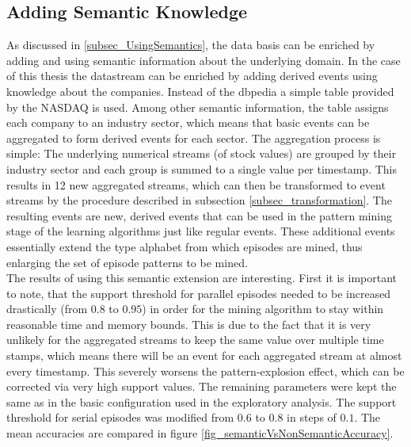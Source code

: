 \subsection{Adding Semantic Knowledge}
As discussed in \ref{subsec_UsingSemantics}, the data basis can be enriched by adding and using semantic information about the underlying domain. In the case of this thesis the datastream can be enriched by adding derived events using knowledge about the companies. Instead of the dbpedia \cite{auer2007dbpedia} a simple table provided by the NASDAQ \cite{nasdaqCompanyList} is used. Among other semantic information, the table assigns each company to an industry sector, which means that basic events can be aggregated to form derived events for each sector. The aggregation process is simple: The underlying numerical streams (of stock values) are grouped by their industry sector and each group is summed to a single value per timestamp. This results in 12 new aggregated streams, which can then be transformed to event streams by the procedure described in subsection \ref{subsec_transformation}. The resulting events are new, derived events that can be used in the pattern mining stage of the learning algorithms just like regular events. These additional events essentially extend the type alphabet from which episodes are mined, thus enlarging the set of episode patterns to be mined.\\
The results of using this semantic extension are interesting. First it is important to note, that the support threshold for parallel episodes needed to be increased drastically (from $0.8$ to $0.95$) in order for the mining algorithm to stay within reasonable time and memory bounds. This is due to the fact that it is very unlikely for the aggregated streams to keep the same value over multiple time stamps, which means there will be an event for each aggregated stream at almost every timestamp. This severely worsens the pattern-explosion effect, which can be corrected via very high support values. The remaining parameters were kept the same as in the basic configuration used in the exploratory analysis. The support threshold for serial episodes was modified from $0.6$ to $0.8$ in steps of $0.1$. The mean accuracies are compared in figure \ref{fig_semanticVsNonSemanticAccuracy}. 

